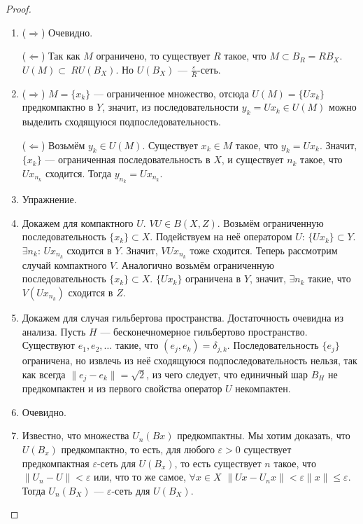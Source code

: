 \documentclass[11pt,openany,a4paper]{scrartcl}
\theoremstyle{plain}
\theoremstyle{definition}
\begin{document}
\begin{proof}
\mbox{}
    \begin{enumerate}
        \item ($\Rightarrow$) Очевидно.
        
        ($\Leftarrow$) Так как $M$ ограничено, то существует $R$ такое, что
        $M \subset B_R = RB_X$. $U(M) \subset~RU(B_X)$.
        Но $U(B_X)$ — $\frac{\varepsilon}{R}$-сеть.
        
        \item ($\Rightarrow$) $M = \{x_k\}$ — ограниченное множество, отсюда
        $U(M) = \{Ux_k\}$ предкомпактно в $Y$, значит, из последовательности
        $y_k = Ux_k \in U(M)$ можно выделить сходящуюся подпоследовательность.
        
        ($\Leftarrow$) Возьмём $y_k \in U(M)$. Существует $x_k \in M$ такое, что
        $y_k = Ux_k$. Значит, $\{x_k\}$ — ограниченная последовательность в $X$, и
        существует $n_k$ такое, что $Ux_{n_k}$ сходится. Тогда $y_{n_k} = Ux_{n_k}$.
        
        \item Упражнение.
        \item Докажем для компактного $U$. $VU \in B(X, Z)$. Возьмём ограниченную 
        последовательность $\{x_k\} \subset X$.
        Подействуем на неё оператором $U$: $\{Ux_k\}\subset Y$. $\exists n_k$: $Ux_{n_k}$
        сходится в $Y$. Значит, $VUx_{n_k}$ тоже сходится.
        Теперь рассмотрим случай компактного $V$. Аналогично возьмём ограниченную 
        последовательность $\{x_k\} \subset X$. $\{Ux_k\}$ ограничена в $Y$, значит,
        $\exists n_k$ такие, что $V(Ux_{n_k})$ сходится в $Z$.
        
        \item Докажем для случая гильбертова пространства. Достаточность очевидна из анализа.
        Пусть $H$ — бесконечномерное гильбертово пространство. Существуют $e_1, e_2, \ldots$
        такие, что $(e_j, e_k) = \delta_{j,k}$. Последовательность $\{e_j\}$ ограничена, но
        извлечь из неё сходящуюся подпоследовательность нельзя, так как всегда
        $\|e_j - e_k\| = \sqrt 2$, из чего следует, что единичный шар $B_H$ не предкомпактен 
        и из первого свойства оператор $U$ некомпактен.
        
        \item Очевидно.
        
        \item Известно, что множества $U_n(Bx)$ предкомпактны. Мы хотим доказать, что
        $U(B_x)$ предкомпактно, то есть, для любого $\varepsilon > 0$ существует
        предкомпактная $\varepsilon$-сеть для $U(B_x)$, то есть существует $n$ такое, что
        $\|U_n - U\| < \varepsilon$ или, что то же самое,
        $\forall x \in X$ $\|Ux - U_nx\| < \varepsilon\|x\| \leqslant \varepsilon$.
        Тогда $U_n(B_X)$ — $\varepsilon$-сеть для $U(B_X)$.
        

\end{enumerate}
\end{proof}
\end{document}
